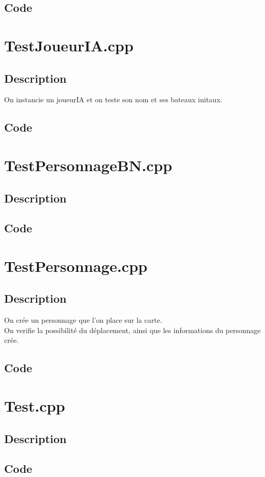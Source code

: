         \subsection{Code}
    \section{TestJoueurIA.cpp}
        \subsection{Description}
        On instancie un joueurIA et on teste son nom et ses bateaux initaux.
        \subsection{Code}
    \section{TestPersonnageBN.cpp}
        \subsection{Description}
        \subsection{Code}
    \section{TestPersonnage.cpp}
        \subsection{Description}
            On crée un personnage que l'on place sur la carte.\\
            On verifie la possibilité du déplacement, ainsi que les informations du personnage crée.
        \subsection{Code}
    \section{Test.cpp}
        \subsection{Description}
        \subsection{Code}
